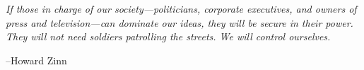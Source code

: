 \documentclass{exam}
\begin{document}
{\em If those in charge of our society---politicians, corporate executives, and owners of press and television---can
  dominate our ideas, they will be secure in their power. They will not need soldiers patrolling the streets. We will
  control ourselves.}

\vspace{.2 cm}

\hspace{1 cm} --Howard Zinn


\fi
\end{document}
